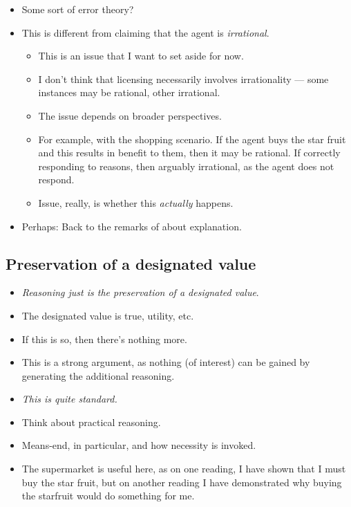 \documentclass[10pt]{article}
\begin{document}
\begin{itemize}
\item Some sort of error theory?
\item This is different from claiming that the agent is \emph{irrational}.
  \begin{itemize}
  \item This is an issue that I want to set aside for now.
  \item I don't think that licensing necessarily involves irrationality --- some instances may be rational, other irrational.
  \item The issue depends on broader perspectives.
  \item For example, with the shopping scenario.
    If the agent buys the star fruit and this results in benefit to them, then it may be rational.
    If correctly responding to reasons, then arguably irrational, as the agent does not respond.
  \item Issue, really, is whether this \emph{actually} happens.
  \end{itemize}
\item Perhaps: Back to the remarks of \citeauthor{Davidson:2001aa} about explanation.
\end{itemize}

\subsection{Preservation of a designated value}
\label{sec:pres-design-value}

\begin{itemize}
\item \emph{Reasoning just is the preservation of a designated value}.
\item The designated value is true, utility, etc.
\item If this is so, then there's nothing more.
\item This is a strong argument, as nothing (of interest) can be gained by generating the additional reasoning.
\end{itemize}

\begin{itemize}
\item \emph{This is quite standard.}
\item Think about practical reasoning.
\item Means-end, in particular, and how necessity is invoked.
\item The supermarket is useful here, as on one reading, I have shown that I must buy the star fruit, but on another reading I have demonstrated why buying the starfruit would do something for me.
\end{itemize}
\end{document}
